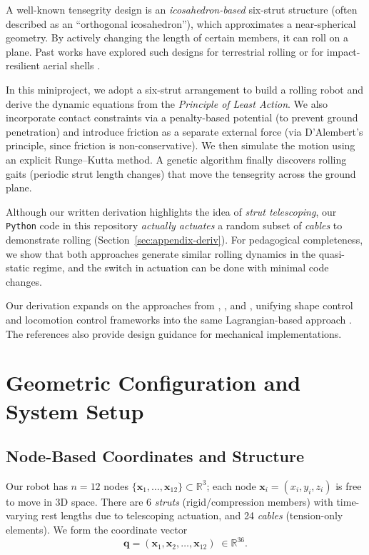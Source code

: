 \documentclass[12pt,letterpaper]{article}
\newcommand{\R}{\mathbb{R}}
\newcommand{\q}{\bm{q}}
\newcommand{\x}{\bm{x}}
\begin{document}
A well-known tensegrity design is an \emph{icosahedron-based} six-strut structure (often described as an ``orthogonal icosahedron''), which approximates a near-spherical geometry. By actively changing the length of certain members, it can roll on a plane. Past works have explored such designs for terrestrial rolling or for impact-resilient aerial shells \cite{ZhengCaiWang2020Rolling}.

In this miniproject, we adopt a six-strut arrangement to build a rolling robot and derive the dynamic equations from the \emph{Principle of Least Action}. We also incorporate contact constraints via a penalty-based potential (to prevent ground penetration) and introduce friction as a separate external force (via D'Alembert’s principle, since friction is non-conservative). We then simulate the motion using an explicit Runge--Kutta method. A genetic algorithm finally discovers rolling gaits (periodic strut length changes) that move the tensegrity across the ground plane.

Although our written derivation highlights the idea of \emph{strut telescoping}, our \texttt{Python} code in this repository \emph{actually actuates} a random subset of \emph{cables} to demonstrate rolling (Section~\ref{sec:appendix-deriv}). For pedagogical completeness, we show that both approaches generate similar rolling dynamics in the quasi-static regime, and the switch in actuation can be done with minimal code changes.

Our derivation expands on the approaches from \cite{SkeltonOliveira2014}, \cite{Cai2020}, and \cite{ZhaWuDimickMueller2024}, unifying shape control and locomotion control frameworks into the same Lagrangian-based approach \cite{Cai2020}. The references \cite{ZhaWuKroegerPerezMueller2020IROS,HiraiImuta2014ICCM,ZhengCaiWang2020Rolling,ZhaWuDimickMueller2024} also provide design guidance for mechanical implementations.

\section{Geometric Configuration and System Setup}
\subsection{Node-Based Coordinates and Structure}
Our robot has $n=12$ nodes $\{\x_1, \dots, \x_{12}\}\subset \R^3$; each node $\x_i=(x_i,y_i,z_i)$ is free to move in 3D space. There are 6 \emph{struts} (rigid/compression members) with time-varying rest lengths due to telescoping actuation, and 24 \emph{cables} (tension-only elements). We form the coordinate vector
\[
 \q = (\x_1,\x_2,\dots,\x_{12}) \;\in \R^{36}.
\]
\end{document}
